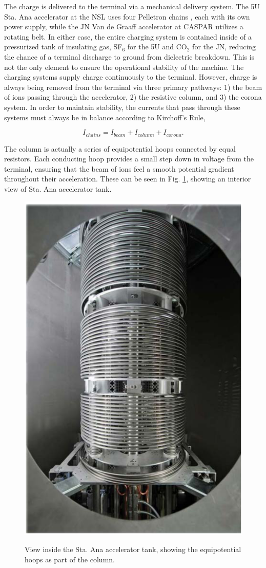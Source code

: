 The charge is delivered to the terminal via a mechanical delivery system. The 5U Sta. Ana accelerator at the NSL uses four Pelletron chains \cite{Herb1974}, each with its own power supply, while the JN Van de Graaff accelerator at CASPAR utilizes a rotating belt. In either case, the entire charging system is contained inside of a pressurized tank of insulating gas, SF$_{6}$ for the 5U and CO$_2$ for the JN, reducing the chance of a terminal discharge to ground from dielectric breakdown. This is not the only element to ensure the operational stability of the machine. The charging systems supply charge continuously to the terminal. However, charge is always being removed from the terminal via three primary pathways: 1) the beam of ions passing through the accelerator, 2) the resistive column, and 3) the corona system. In order to maintain stability, the currents that pass through these systems must always be in balance according to Kirchoff's Rule,

\begin{equation}
I_{chains} = I_{beam} + I_{column} + I_{corona}.
\end{equation}

\noindent The column is actually a series of equipotential hoops connected by equal resistors. Each conducting hoop provides a small step down in voltage from the terminal, ensuring that the beam of ions feel a smooth potential gradient throughout their acceleration. These can be seen in Fig. \ref{fig: column}, showing an interior view of Sta. Ana accelerator tank. 


\begin{figure}
\centering
\includegraphics[width=0.5\linewidth]{figures/inside5U.png}
\label{fig: column}
\caption{View inside the Sta. Ana accelerator tank, showing the equipotential hoops as part of the column.}
\end{figure}


